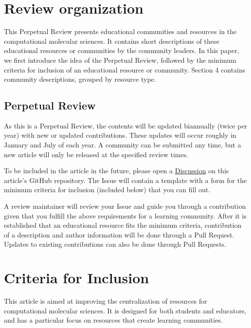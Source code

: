 \documentclass[9pt,review]{livecoms}
\begin{document}
\section{Review organization}

This Perpetual Review presents educational communities and resources in the computational molecular sciences. 
It contains short descriptions of these educational resources or communities by the community leaders. 
In this paper, we first introduce the idea of the Perpetual Review, followed by the minimum criteria for inclusion of an educational resource or community. 
Section 4 contains community descriptions, grouped by resource type.

\subsection{Perpetual Review}

As this is a Perpetual Review, the contents will be updated biannually (twice per year) with new or updated contributions. These updates will occur roughly in January and July of each year. A community can be submitted any time, but a new article will only be released at the specified review times.

To be included in the article in the future, please open a \href{https://docs.github.com/en/discussions/quickstart#creating-a-new-discussion}{Discussion} on this article's GitHub repository. The Issue will contain a template with a form for the minimum criteria for inclusion (included below) that you can fill out. 

A review maintainer will review your Issue and guide you through a contribution given that you fulfill the above requirements for a learning community. After it is established that an educational resource fits the minimum criteria, contribution of a description and author information will be done through a Pull Request. Updates to existing contributions can also be done through Pull Requests.

\section{Criteria for Inclusion}


This article is aimed at improving the centralization of resources for computational molecular sciences. It is designed for both students and educators, and has a particular focus on resources that create learning communities. 
\end{document}
